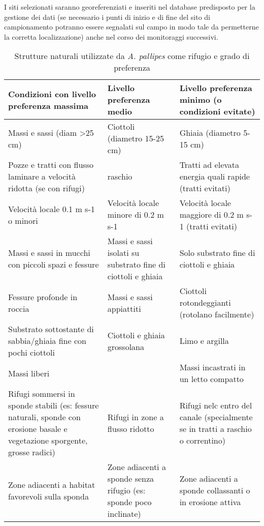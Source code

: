 \documentclass[11pt,a4paper,italian,twoside,openany]{memoir}
\begin{document}
I siti selezionati saranno georeferenziati e inseriti nel database predisposto per la gestione dei dati (se necessario i punti di inizio e di fine del sito di campionamento potranno essere segnalati sul campo in modo tale da permetterne la corretta localizzazione) anche nel corso dei monitoraggi successivi.

\begin{table}[]
\centering
\begin{tabular}{@{}p{}p{}p{}@{}}
\toprule
\textbf{Condizioni con livello preferenza massima}     & \textbf{Livello preferenza medio} & \textbf{Livello preferenza minimo (o condizioni evitate)}     \\ \midrule

Massi e sassi (diam \textgreater25 cm)   & Ciottoli (diametro 15-25 cm)  & Ghiaia (diametro 5-15 cm) \\

\rowcolor[HTML]{EFEFEF} Pozze e tratti con flusso laminare  a velocità  ridotta (se con rifugi)   & raschio     & Tratti ad elevata energia quali rapide (tratti evitati)   \\

Velocità  locale 0.1 m s-1 o minori      & Velocità  locale minore di 0.2 m s-1  & Velocità  locale maggiore di 0.2 m s-1 (tratti evitati)   \\

\rowcolor[HTML]{EFEFEF} Massi e sassi in mucchi con piccoli spazi e fessure    & Massi e sassi isolati su substrato fine di ciottoli e ghiaia  & Solo substrato fine di ciottoli e ghiaia    \\

Fessure profonde in roccia & Massi e sassi appiattiti  & Ciottoli rotondeggianti (rotolano facilmente)   \\

\rowcolor[HTML]{EFEFEF} Substrato sottostante di sabbia/ghiaia fine con pochi ciottoli & Ciottoli e ghiaia grossolana  & Limo e argilla \\

Massi liberi &  & Massi incastrati in un letto compatto   \\

\rowcolor[HTML]{EFEFEF} Rifugi sommersi in sponde stabili (es: fessure naturali, sponde con erosione basale e vegetazione sporgente, grosse radici) & Rifugi in zone a flusso ridotto   & Rifugi nelc entro del canale (specialmente se in tratti a raschio o correntino) \\

Zone adiacenti a habitat favorevoli sulla sponda & Zone adiacenti a sponde senza rifugio (es: sponde poco inclinate) & Zone adiacenti a sponde collassanti o in erosione attiva  \\ \bottomrule
\end{tabular}
\caption{Strutture naturali utilizzate da \emph{A. pallipes} come rifugio e grado di preferenza}
\label{tab_8}
\end{table}
\end{document}
